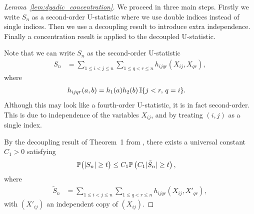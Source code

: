 \begin{proof}[Lemma~\ref{lem:dyadic_concentration}]

  We proceed in three main steps.
  Firstly we write $S_n$ as a second-order U-statistic
  where we use double indices instead of single indices.
  Then we use a decoupling result to introduce extra independence.
  Finally a concentration result is applied
  to the decoupled U-statistic.


  Note that we can write $S_n$ as
  the second-order U-statistic
  \begin{align*}
    S_n
    &=
    \sum_{1 \leq i < j \leq n}
    \sum_{1 \leq q < r \leq n}
    h_{ijqr}
    (X_{ij}, X_{qr}),
  \end{align*}
  where
  \begin{align*}
    h_{ijqr}
    (a,b)
    &=
    h_1(a) h_2(b) \,
    \I\{j<r,\, q=i\}.
  \end{align*}
  Although this may look like a fourth-order
  U-statistic,
  it is in fact second-order.
  This is due to independence of the variables
  $X_{ij}$,
  and by treating $(i,j)$ as a single index.


  By the decoupling result of Theorem~1
  from \citet{de1995decoupling}, there exists a universal
  constant $C_1 > 0$ satisfying
  \begin{align*}
    \P\big(
    |S_n| \geq t
    \big)
    &\leq
    C_1 \P\left(
      C_1 |\tilde S_n| \geq t
    \right),
  \end{align*}
  where
  \begin{align*}
    \tilde S_n
    &=
    \sum_{1 \leq i < j \leq n}
    \sum_{1 \leq q < r \leq n}
    h_{ijqr}
    (X_{ij}, X'_{qr}),
  \end{align*}
  with $(X'_{ij})$
  an independent copy of $(X_{ij})$.



\end{proof}
